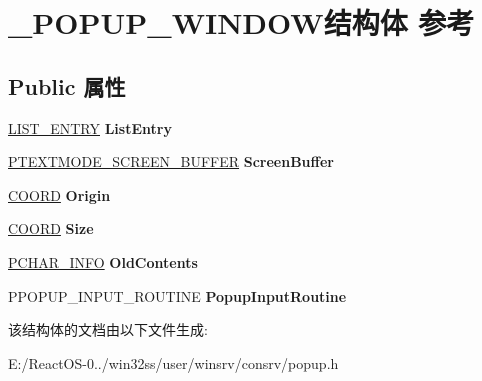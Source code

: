 \hypertarget{struct___p_o_p_u_p___w_i_n_d_o_w}{}\section{\+\_\+\+P\+O\+P\+U\+P\+\_\+\+W\+I\+N\+D\+O\+W结构体 参考}
\label{struct___p_o_p_u_p___w_i_n_d_o_w}
\subsection*{Public 属性}
\begin{DoxyCompactItemize}
\item 
\mbox{\label{struct___p_o_p_u_p___w_i_n_d_o_w_a7f80b6ef73e956756e989ad23a15644e}} 
\hyperlink{struct___l_i_s_t___e_n_t_r_y}{L\+I\+S\+T\+\_\+\+E\+N\+T\+RY} {\bfseries List\+Entry}
\item 
\mbox{\label{struct___p_o_p_u_p___w_i_n_d_o_w_a633b334e0472515eaad8d48ddf56f9ed}} 
\hyperlink{struct___t_e_x_t_m_o_d_e___s_c_r_e_e_n___b_u_f_f_e_r}{P\+T\+E\+X\+T\+M\+O\+D\+E\+\_\+\+S\+C\+R\+E\+E\+N\+\_\+\+B\+U\+F\+F\+ER} {\bfseries Screen\+Buffer}
\item 
\mbox{\label{struct___p_o_p_u_p___w_i_n_d_o_w_a3d620fd78d00bd4b27fcc19e285d73aa}} 
\hyperlink{struct___c_o_o_r_d}{C\+O\+O\+RD} {\bfseries Origin}
\item 
\mbox{\label{struct___p_o_p_u_p___w_i_n_d_o_w_aec8657727239b4c24c55b0d14d025d82}} 
\hyperlink{struct___c_o_o_r_d}{C\+O\+O\+RD} {\bfseries Size}
\item 
\mbox{\label{struct___p_o_p_u_p___w_i_n_d_o_w_a2541a015371629376177b365713ed778}} 
\hyperlink{struct___c_h_a_r___i_n_f_o}{P\+C\+H\+A\+R\+\_\+\+I\+N\+FO} {\bfseries Old\+Contents}
\item 
\mbox{\label{struct___p_o_p_u_p___w_i_n_d_o_w_af9bb01114a1ff5f2b235ea2b087272de}} 
P\+P\+O\+P\+U\+P\+\_\+\+I\+N\+P\+U\+T\+\_\+\+R\+O\+U\+T\+I\+NE {\bfseries Popup\+Input\+Routine}
\end{DoxyCompactItemize}


该结构体的文档由以下文件生成\+:\begin{DoxyCompactItemize}
\item 
E\+:/\+React\+O\+S-\/0../win32ss/user/winsrv/consrv/popup.\+h\end{DoxyCompactItemize}
